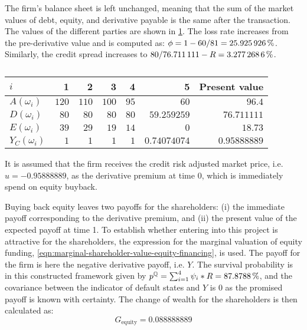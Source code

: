 \documentclass[../main.tex]{subfiles}
\begin{document}
            The firm's balance sheet is left unchanged, meaning that the sum of the market values of debt, equity, 
            and derivative payable is the same after the transaction. 
            The values of the different parties are shown in \cref{tbl:example-equity-buyback}. 
            The loss rate increases from the pre-derivative value and is computed as:
            $\phi = 1 - \num{60}/\num{81} = \pct{0.25925926}$.
            Similarly, the credit spread increases to
            $\num{80}/\num{76.711111} - \grossrfrate = \pct{0.032772686}$.
            \begin{table}[H]
                \centering
                \begin{tabular}{l|rrrrr||r}
                    $i$ & 1 & 2 & 3 & 4 & 5 & Present value \\
                    \hline
                    $A(\omega_{i})$ & $\num{120}$ & $\num{110}$ & $\num{100}$ & $\num{95}$ & $\num{60}$ & $\num{96.4}$ \\
                    $D(\omega_{i})$ & $\num{80}$ & $\num{80}$ & $\num{80}$ & $\num{80}$ & $\num{59.259259}$ & $\num{76.711111}$ \\
                    $E(\omega_{i})$ & $\num{39}$ & $\num{29}$ & $\num{19}$ & $\num{14}$ & $\num{0}$ & $\num{18.73}$ \\
                    $Y_C(\omega_{i})$ & $\num{1}$ & $\num{1}$ & $\num{1}$ & $\num{1}$ & $\num{0.74074074}$ & $\num{0.95888889}$ \\
                \end{tabular}
                \caption{}
                \label{tbl:example-equity-buyback}
            \end{table}

            It is assumed that the firm receives the credit risk adjusted market price,
            i.e. $u=\num{-0.95888889}$, as the derivative premium at time 0, which is immediately spend on equity buyback.

            Buying back equity leaves two payoffs for the shareholders:
            (i) the immediate payoff corresponding to the derivative premium, and
            (ii) the present value of the expected payoff at time 1.
            To establish whether entering into this project is attractive for the shareholders,
            the expression for the marginal valuation of equity funding, \cref{eqn:marginal-shareholder-value-equity-financing}, is used.
            The payoff for the firm is here the negative derivative payoff, i.e. $Y$.
            The survival probability is in this constructed framework given by $p^{\rnmeasure} = \sum_{i=1}^{4} \psi_{i} * \grossrfrate = \pct{0.878788}$, and the covariance between the indicator of default states and $Y$ is 0 as the promised payoff is known with certainty.
            The change of wealth for the shareholders is then calculated as:
            \begin{equation}
                G_{\text{equity}} = \num{0.088888889}
            \end{equation}
            
\end{document}
